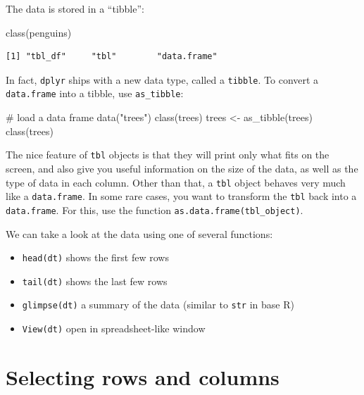 \documentclass[
  letterpaper,
  DIV=11,
  numbers=noendperiod]{scrreprt}
\newenvironment{Shaded}{\begin{snugshade}}{\end{snugshade}}
\newcommand{\CommentTok}[1]{\textcolor[rgb]{0.37,0.37,0.37}{#1}}
\newcommand{\FunctionTok}[1]{\textcolor[rgb]{0.28,0.35,0.67}{#1}}
\newcommand{\NormalTok}[1]{\textcolor[rgb]{0.00,0.23,0.31}{#1}}
\newcommand{\OtherTok}[1]{\textcolor[rgb]{0.00,0.23,0.31}{#1}}
\newcommand{\StringTok}[1]{\textcolor[rgb]{0.13,0.47,0.30}{#1}}
\providecommand{\tightlist}{%
  \setlength{\itemsep}{0pt}\setlength{\parskip}{0pt}}\usepackage{longtable,booktabs,array}
\begin{document}
The data is stored in a ``tibble'':

\begin{Shaded}
\begin{Highlighting}[]
\FunctionTok{class}\NormalTok{(penguins)}
\end{Highlighting}
\end{Shaded}

\begin{verbatim}
[1] "tbl_df"     "tbl"        "data.frame"
\end{verbatim}

In fact, \texttt{dplyr} ships with a new data type, called a
\texttt{tibble}. To convert a \texttt{data.frame} into a tibble, use
\texttt{as\_tibble}:

\begin{Shaded}
\begin{Highlighting}[]
\CommentTok{\# load a data frame}
\FunctionTok{data}\NormalTok{(}\StringTok{"trees"}\NormalTok{)}
\FunctionTok{class}\NormalTok{(trees)}
\NormalTok{trees }\OtherTok{\textless{}{-}} \FunctionTok{as\_tibble}\NormalTok{(trees)}
\FunctionTok{class}\NormalTok{(trees)}
\end{Highlighting}
\end{Shaded}

The nice feature of \texttt{tbl} objects is that they will print only
what fits on the screen, and also give you useful information on the
size of the data, as well as the type of data in each column. Other than
that, a \texttt{tbl} object behaves very much like a
\texttt{data.frame}. In some rare cases, you want to transform the
\texttt{tbl} back into a \texttt{data.frame}. For this, use the function
\texttt{as.data.frame(tbl\_object)}.

We can take a look at the data using one of several functions:

\begin{itemize}
\tightlist
\item
  \texttt{head(dt)} shows the first few rows
\item
  \texttt{tail(dt)} shows the last few rows
\item
  \texttt{glimpse(dt)} a summary of the data (similar to \texttt{str} in
  base R)
\item
  \texttt{View(dt)} open in spreadsheet-like window
\end{itemize}

\hypertarget{selecting-rows-and-columns}{%
\section{Selecting rows and columns}\label{selecting-rows-and-columns}}
\end{document}
